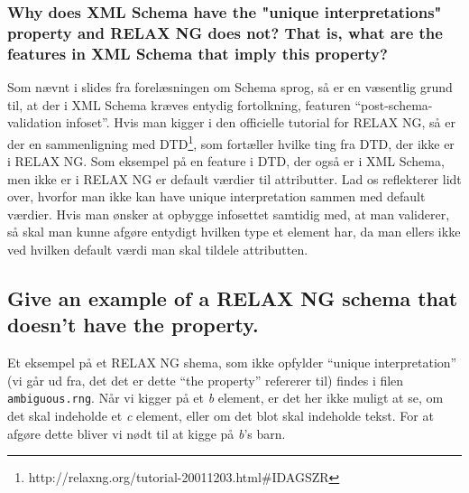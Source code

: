 \documentclass[a4paper,10pt]{article}
\begin{document}
\subsubsection*{Why does XML Schema have the "unique interpretations" property and RELAX NG does not? That is, what are the features in XML Schema that imply this property?} 
Som nævnt i slides fra forelæsningen om Schema sprog, så er en væsentlig grund til, at der i XML Schema kræves entydig fortolkning, featuren ``post-schema-validation infoset''. Hvis man kigger i den officielle tutorial for RELAX NG, så er der en sammenligning med DTD\footnote{http://relaxng.org/tutorial-20011203.html\#IDAGSZR}, som fortæller hvilke ting fra DTD, der ikke er i RELAX NG. Som eksempel på en feature i DTD, der også er i XML Schema, men ikke er i RELAX NG er default værdier til attributter. Lad os reflekterer lidt over, hvorfor  man ikke kan have unique interpretation sammen med default værdier. Hvis man ønsker at opbygge infosettet samtidig med, at man validerer, så skal man kunne afgøre entydigt hvilken type et element har, da man ellers ikke ved hvilken default værdi man skal tildele attributten.

\subsection*{Give an example of a RELAX NG schema that doesn't have the property.}
Et eksempel på et RELAX NG shema, som ikke opfylder ``unique interpretation'' (vi går ud fra, det det er dette ``the property'' refererer til) findes i filen \texttt{ambiguous.rng}. Når vi kigger på et \emph{b} element, er det her ikke muligt at se, om det skal indeholde et \emph{c} element, eller om det blot skal indeholde tekst. For at afgøre dette bliver vi nødt til at kigge på \emph{b}'s barn.
\end{document}
